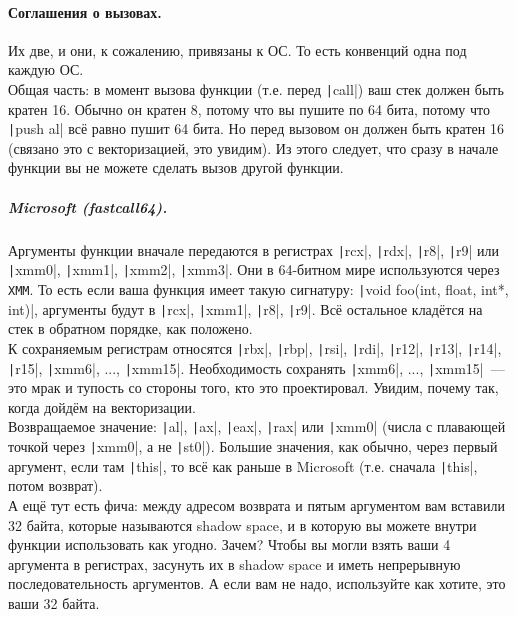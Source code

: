 \documentclass{article}
\begin{document}
    \paragraph{Соглашения о вызовах.}
    Их две, и они, к сожалению, привязаны к ОС. То есть конвенций одна под каждую ОС.\\
    Общая часть: в момент вызова функции (т.е. перед \texttt|call|) ваш стек должен быть кратен 16. Обычно он кратен 8, потому что вы пушите по 64 бита, потому что \texttt|push al| всё равно пушит 64 бита. Но перед вызовом он должен быть кратен 16 (связано это с векторизацией, это увидим). Из этого следует, что сразу в начале функции вы не можете сделать вызов другой функции.
    \subparagraph{Microsoft (fastcall64).}
    Аргументы функции вначале передаются в регистрах \texttt|rcx|, \texttt|rdx|, \texttt|r8|, \texttt|r9| или \texttt|xmm0|, \texttt|xmm1|, \texttt|xmm2|, \texttt|xmm3|. Они в 64-битном мире используются через \Verb|XMM|. То есть если ваша функция имеет такую сигнатуру: \texttt|void foo(int, float, int*, int)|, аргументы будут в \texttt|rcx|, \texttt|xmm1|, \texttt|r8|, \texttt|r9|. Всё остальное кладётся на стек в обратном порядке, как положено.\\
    К сохраняемым регистрам относятся \texttt|rbx|, \texttt|rbp|, \texttt|rsi|, \texttt|rdi|, \texttt|r12|, \texttt|r13|, \texttt|r14|, \texttt|r15|, \texttt|xmm6|, ..., \texttt|xmm15|. Необходимость сохранять \texttt|xmm6|, ..., \texttt|xmm15|~--- это мрак и тупость со стороны того, кто это проектировал. Увидим, почему так, когда дойдём на векторизации.\\
    Возвращаемое значение: \texttt|al|, \texttt|ax|, \texttt|eax|, \texttt|rax| или \texttt|xmm0| (числа с плавающей точкой через \texttt|xmm0|, а не \texttt|st0|). Большие значения, как обычно, через первый аргумент, если там \texttt|this|, то всё как раньше в Microsoft (т.е. сначала \texttt|this|, потом возврат).\\
    А ещё тут есть фича: между адресом возврата и пятым аргументом вам вставили 32 байта, которые называются shadow space, и в которую вы можете внутри функции использовать как угодно. Зачем? Чтобы вы могли взять ваши 4 аргумента в регистрах, засунуть их в shadow space и иметь непрерывную последовательность аргументов. А если вам не надо, используйте как хотите, это ваши 32 байта.\\
\end{document}
